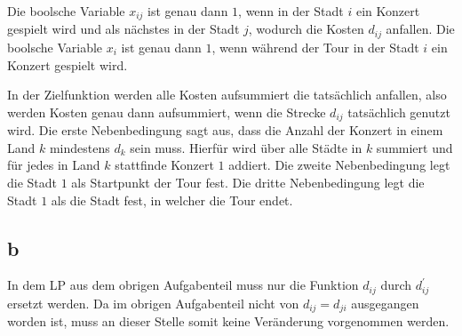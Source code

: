 \documentclass[10pt]{article}
\begin{document}
      Die boolsche Variable $x_{ij}$ ist genau dann $1$, wenn in der Stadt $i$
      ein Konzert gespielt wird und als nächstes in der Stadt $j$, wodurch die
      Kosten $d_{ij}$ anfallen.
      Die boolsche Variable $x_{i}$ ist genau dann $1$, wenn während der Tour
      in der Stadt $i$ ein Konzert gespielt wird.

      In der Zielfunktion werden alle Kosten aufsummiert die tatsächlich
      anfallen, also werden Kosten genau dann aufsummiert, wenn die Strecke
      $d_{ij}$ tatsächlich genutzt wird.
      Die erste Nebenbedingung sagt aus, dass die Anzahl der Konzert in einem
      Land $k$ mindestens $d_{k}$ sein muss. Hierfür wird über alle Städte in
      $k$ summiert und für jedes in Land $k$ stattfinde Konzert $1$ addiert.
      Die zweite Nebenbedingung legt die Stadt $1$ als Startpunkt der Tour fest.
      Die dritte Nebenbedingung legt die Stadt $1$ als die Stadt fest, in
      welcher die Tour endet.

    \subsection*{b}
      In dem LP aus dem obrigen Aufgabenteil muss nur die Funktion $d_{ij}$
      durch $d_{ij}^{\prime}$ ersetzt werden. Da im obrigen Aufgabenteil nicht
      von $d_{ij}=d_{ji}$ ausgegangen worden ist, muss an dieser Stelle somit
      keine Veränderung vorgenommen werden.
\end{document}
